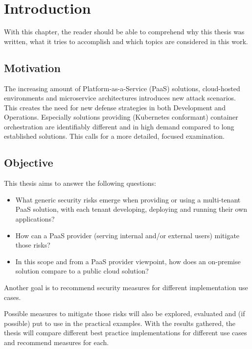 \chapter{Introduction}
With this chapter, the reader should be able to comprehend why this thesis was written, what it tries to accomplish and which topics are considered in this work.

\section{Motivation}

The increasing amount of Platform-as-a-Service (PaaS) solutions, cloud-hosted environments and
microservice architectures introduces new attack scenarios. This creates the need for new defense
strategies in both Development and Operations. Especially solutions providing (Kubernetes
conformant) container orchestration are identifiably different and in high demand compared to long
established solutions. This calls for a more detailed, focused examination. \\

\section{Objective}

This thesis aims to answer the following questions:

\begin{itemize}

\item What generic security risks emerge when providing or using a multi-tenant PaaS solution,
with each tenant developing, deploying and running their own applications? 

\item How can a PaaS provider (serving internal and/or external users) mitigate those risks? 

\item  In this scope and from a PaaS provider viewpoint, how does an on-premise solution compare
to a public cloud solution? 

\end{itemize}

Another goal is to recommend security measures for different implementation use cases.

Possible measures to mitigate those risks will also be explored, evaluated and (if possible) put to use in the practical examples. 
With the results gathered, the thesis will compare different best practice implementations for different use cases and recommend measures for each.

